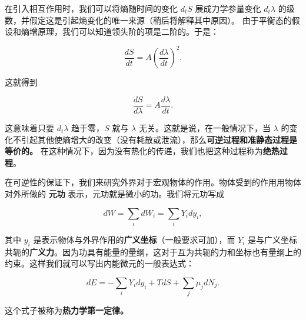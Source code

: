 在引入相互作用时，我们可以将熵随时间的变化 $d_t S$ 展成力学参量变化 $d_t \lambda$ 的级数，并假定这是引起熵变化的唯一来源（稍后将解释其中原因）。 由于平衡态的假设和熵增原理，我们可以知道领头阶的项是二阶的。于是：
\begin{linenomath}\begin{equation}
\frac{d S}{d t} = A \left( \frac{d \lambda}{d t} \right)^2.
\end{equation}\end{linenomath}
这就得到
\begin{linenomath}\begin{equation}
\frac{d S}{d \lambda} = A \frac{d \lambda}{d t}.
\end{equation}\end{linenomath}
这意味着只要 $d_t \lambda$ 趋于零，$S$ 就与 $\lambda$ 无关。这就是说，在一般情况下，当 $\lambda$ 的变化不引起其他使熵增大的改变（没有耗散或泄流），那么\textbf{可逆过程和准静态过程是等价的。} 在这种情况下，因为没有热化的传递，我们也把这种过程称为\textbf{绝热过程}。

在可逆性的保证下，我们来研究外界对于宏观物体的作用。物体受到的作用用物体对外所做的 \textbf{元功} 表示，元功就是微小的功。我们将元功写成
\begin{linenomath}\begin{equation}
dW = \sum_{i } dW_i = \sum_i Y_idy_i,
\end{equation}\end{linenomath}
其中 $y_i$ 是表示物体与外界作用的\textbf{广义坐标}（一般要求可加），而 $Y_i$ 是与广义坐标共轭的\textbf{广义力}。因为功具有能量的量纲，这对于互为共轭的力和坐标也有量纲上的约束。这样我们就可以写出内能微元的一般表达式：
\begin{linenomath}\begin{equation}
dE= -\sum_{i} Y_idy_i + TdS + \sum_j \mu_jdN_j. \label{internal_energy}
\end{equation}\end{linenomath}
这个式子被称为\textbf{热力学第一定律。}

